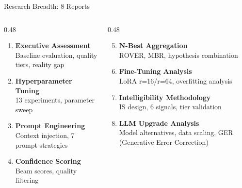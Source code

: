 \begin{frame}{Research Breadth: 8 Reports}
  \vspace{2pt}
  \begin{columns}[T]
    \begin{column}{0.48\textwidth}
      \begin{enumerate}
        \item \textbf{Executive Assessment}\\
              {\scriptsize Baseline evaluation, quality tiers, reality gap}
        \item \textbf{Hyperparameter Tuning}\\
              {\scriptsize 13 experiments, parameter sweep}
        \item \textbf{Prompt Engineering}\\
              {\scriptsize Context injection, 7 prompt strategies}
        \item \textbf{Confidence Scoring}\\
              {\scriptsize Beam scores, quality filtering}
      \end{enumerate}
    \end{column}
    \begin{column}{0.48\textwidth}
      \begin{enumerate}
        \setcounter{enumi}{4}
        \item \textbf{N-Best Aggregation}\\
              {\scriptsize ROVER, MBR, hypothesis combination}
        \item \textbf{Fine-Tuning Analysis}\\
              {\scriptsize LoRA r=16/r=64, overfitting analysis}
        \item \textbf{Intelligibility Methodology}\\
              {\scriptsize IS design, 6 signals, tier validation}
        \item \textbf{LLM Upgrade Analysis}\\
              {\scriptsize Model alternatives, data scaling, GER (Generative Error Correction)}
      \end{enumerate}
    \end{column}
  \end{columns}

  \vspace{8pt}
  \centering

\end{frame}
